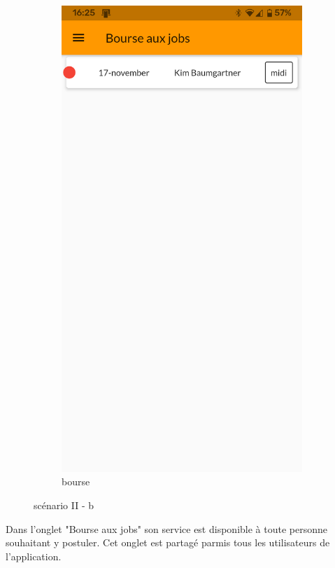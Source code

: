 \begin{figure}[!h]
\begin{subfigure}{.3\textwidth}
        \includegraphics[width=0.9\linewidth]{screenshots/scenario_02/bourse_jobs.png}
        \caption{bourse}
        \label{fig:bourse}
    \end{subfigure}
    \caption{scénario II - b}
    \label{fig:scen02b}
\end{figure}

Dans l'onglet "Bourse aux jobs" son service est disponible à toute personne souhaitant y postuler. 
Cet onglet est partagé parmis tous les utilisateurs de l'application.

